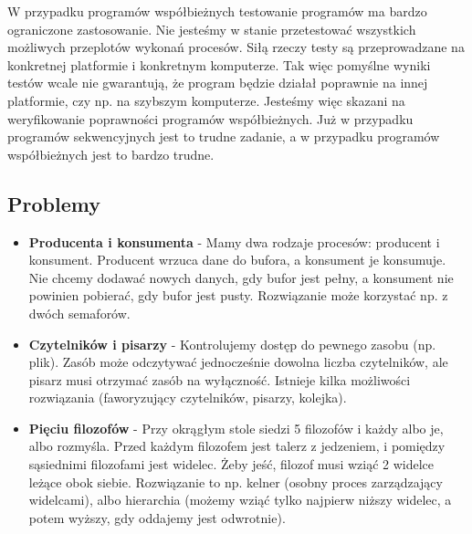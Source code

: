 W przypadku programów współbieżnych testowanie programów ma bardzo ograniczone zastosowanie.
Nie jesteśmy w stanie przetestować wszystkich możliwych przeplotów wykonań procesów.
Siłą rzeczy testy są przeprowadzane na konkretnej platformie i konkretnym komputerze.
Tak więc pomyślne wyniki testów wcale nie gwarantują, że program będzie działał poprawnie na innej platformie,
czy np. na szybszym komputerze.
Jesteśmy więc skazani na weryfikowanie poprawności programów współbieżnych.
Już w przypadku programów sekwencyjnych jest to trudne zadanie,
a w przypadku programów współbieżnych jest to bardzo trudne.

\subsection{Problemy}
\begin{itemize}[itemsep=0pt,partopsep=0pt, parsep=0pt]
    \item \textbf{Producenta i konsumenta} -
    Mamy dwa rodzaje procesów: producent i konsument.
    Producent wrzuca dane do bufora, a konsument je konsumuje.
    Nie chcemy dodawać nowych danych, gdy bufor jest pełny, a konsument nie powinien pobierać, gdy bufor jest pusty.
    Rozwiązanie może korzystać np. z dwóch semaforów.
    \item \textbf{Czytelników i pisarzy} -
    Kontrolujemy dostęp do pewnego zasobu (np. plik).
    Zasób może odczytywać jednocześnie dowolna liczba czytelników, ale pisarz musi otrzymać zasób na wyłączność.
    Istnieje kilka możliwości rozwiązania (faworyzujący czytelników, pisarzy, kolejka).
    \item \textbf{Pięciu filozofów} -
    Przy okrągłym stole siedzi 5 filozofów i każdy albo je, albo rozmyśla.
    Przed każdym filozofem jest talerz z jedzeniem, i pomiędzy sąsiednimi filozofami jest widelec.
    Żeby jeść, filozof musi wziąć 2 widelce leżące obok siebie.
    Rozwiązanie to np. kelner (osobny proces zarządzający widelcami),
    albo hierarchia (możemy wziąć tylko najpierw niższy widelec, a potem wyższy, gdy oddajemy jest odwrotnie).
\end{itemize}

